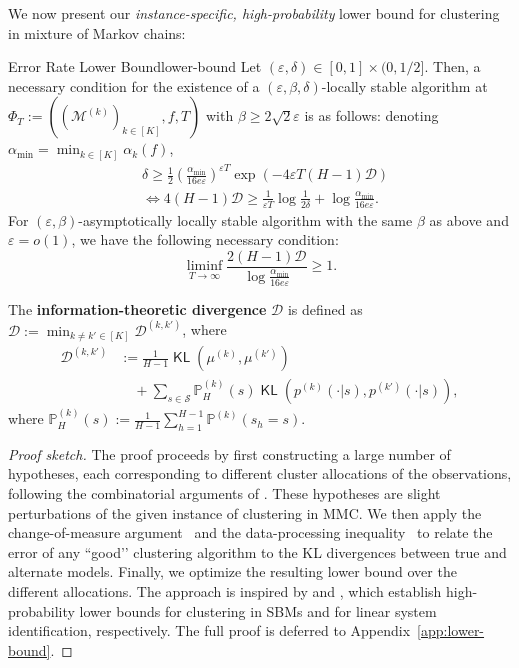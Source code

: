 \documentclass[twoside]{article}
\DeclareMathOperator{\KL}{{\mathsf{KL}}}
\def\gD{{\mathcal{D}}}
\def\gM{{\mathcal{M}}}
\def\gS{{\mathcal{S}}}
\def\sP{{\mathbb{P}}}
\theoremstyle{plain}
\begin{document}
We now present our \textit{instance-specific, high-probability} lower bound for clustering in mixture of Markov chains:
\begin{theorem}{Error Rate Lower Bound}{lower-bound}
    Let $(\varepsilon, \delta) \in [0, 1] \times (0, 1/2]$.
    Then, a necessary condition for the existence of a $(\varepsilon, \beta, \delta)$-locally stable algorithm at $\Phi_T := ((\gM^{(k)})_{k \in [K]}, f, T)$ with $\beta \geq 2\sqrt{2} \varepsilon$ is as follows: denoting $\alpha_{\min} = \min_{k \in [K]} \alpha_k(f)$,
    \begin{align}
        &\delta \geq \frac{1}{2} \left( \frac{\alpha_{\min}}{16 e \varepsilon} \right)^{\varepsilon T} \exp\left( -4 \varepsilon T (H - 1) \gD \right) \nonumber \\
        &\Longleftrightarrow
        4 (H - 1) \gD \geq \frac{1}{\varepsilon T}\log\frac{1}{2\delta} + \log\frac{\alpha_{\min}}{16 e \varepsilon}. \label{eqn:necessary}
    \end{align}
    For $(\varepsilon, \beta)$-asymptotically locally stable algorithm with the same $\beta$ as above and $\varepsilon = o(1)$, we have the following necessary condition:
    \begin{equation}
        \liminf_{T \rightarrow \infty} \frac{2 (H - 1) \gD}{\log \frac{\alpha_{\min}}{16 e \varepsilon}} \geq 1.
    \end{equation}
    
    The {\bf information-theoretic divergence} $\gD$ is defined as $\gD := \min_{k \neq k' \in [K]} \gD^{(k, k')}$, where
    \begin{align*}
        \gD^{(k, k')} &:= \frac{1}{H - 1} \KL\left( \mu^{(k)}, \mu^{(k')} \right) \\
        &\quad + \sum_{s \in \gS} \sP_H^{(k)}(s) \KL\left( p^{(k)}(\cdot | s), p^{(k')}(\cdot | s) \right),
    \end{align*}
    where $\sP_H^{(k)}(s) := \frac{1}{H - 1} \sum_{h=1}^{H-1} \sP^{(k)}(s_h = s)$.
\end{theorem}
\begin{proof}[Proof sketch]
    The proof proceeds by first constructing a large number of hypotheses, each corresponding to different cluster allocations of the observations, following the combinatorial arguments of \citet{yun2019optimal}.
    These hypotheses are slight perturbations of the given instance of clustering in MMC.
    We then apply the change-of-measure argument~\citep{lai1985efficient} and the data-processing inequality~\citep[Lemma 1]{garivier2019lower} to relate the error of any “good’’ clustering algorithm to the KL divergences between true and alternate models.
    Finally, we optimize the resulting lower bound over the different allocations.
    The approach is inspired by \citet[Theorem 1]{yun2019optimal} and \citet[Theorem 2]{jedra2023identification}, which establish high-probability lower bounds for clustering in SBMs and for linear system identification, respectively.
    The full proof is deferred to Appendix~\ref{app:lower-bound}.
\end{proof}
\end{document}
